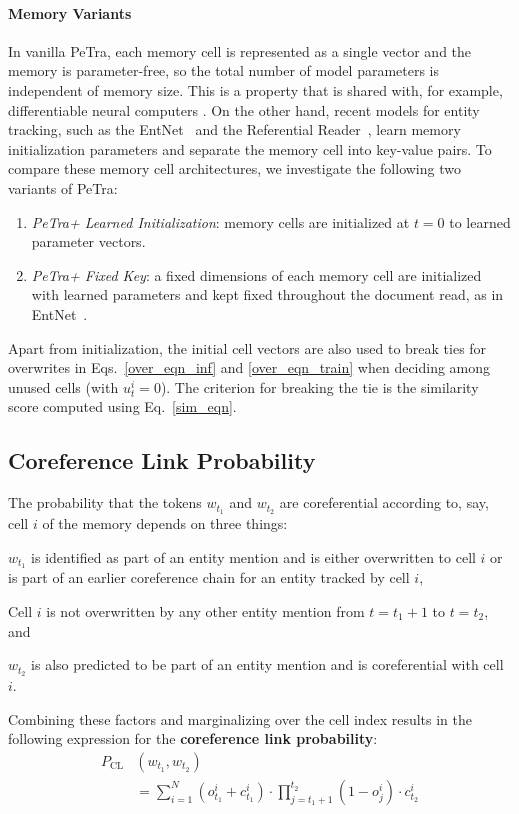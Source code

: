 \documentclass[11pt,a4paper]{article}
\newcommand{\modelname}{PeTra\xspace}
\begin{document}
\paragraph{Memory Variants}
In vanilla \modelname, each memory cell is represented as a single vector and the memory is parameter-free,
so the total number of model parameters is independent of memory size.  This is a property that is shared with, for example, differentiable neural computers \citep{graves2016hybrid}.
On the other hand, recent models for entity tracking, such as the EntNet~\cite{henaff2016tracking} and the Referential Reader~\cite{liu2019referential}, learn memory initialization parameters and separate the memory cell into key-value pairs.
To compare these memory cell architectures, we investigate the following two variants of \modelname:
\begin{enumerate}
    \item \emph{\modelname + Learned Initialization}: memory cells are initialized at $t=0$ to learned parameter vectors.
    \item \emph{\modelname + Fixed Key}: a fixed dimensions of each memory cell are initialized with  learned parameters and kept fixed throughout the document read, as in EntNet~\cite{henaff2016tracking}.
\end{enumerate}
Apart from initialization, the initial cell vectors are also used to break ties for overwrites in Eqs.~\eqref{over_eqn_inf} and \eqref{over_eqn_train} when deciding among unused cells (with $u^i_t = 0$). The criterion for breaking the tie is the similarity score computed using Eq.~\eqref{sim_eqn}.

\subsection{Coreference Link Probability}
\label{sec:coref_link_prob}
The probability that the tokens $w_{t_1}$ and $w_{t_2}$ are coreferential according to, say, cell $i$ of the memory depends on three things:
\begin{enumerate*}[label=(\alph*)]
    \item $w_{t_1}$ is identified as part of an entity mention and is either overwritten to cell $i$ or is part of an earlier coreference chain for an entity tracked by cell $i$,
    \item Cell $i$ is not overwritten by any other entity mention from $t = {t_1} + 1$ to $t = {t_2}$, and
    \item $w_{t_2}$ is also predicted to be part of an entity mention and  is coreferential with cell $i$.
\end{enumerate*}
Combining these factors and marginalizing over the cell index results in the
following expression for the {\bf coreference link probability}: \begin{align}\label{prob_eqn}
P_{\mathrm{CL}}&(w_{t_1}, w_{t_2})  \nonumber\\
&= \sum_{i=1}^{N} (o_{t_1}^{i} + c_{t_1}^{i}) \cdot \! \prod_{j=t_1 + 1}^{t_2} (1 - o_{j} ^ {i}) \cdot c_{t_2}^{i}
\end{align}
\end{document}
